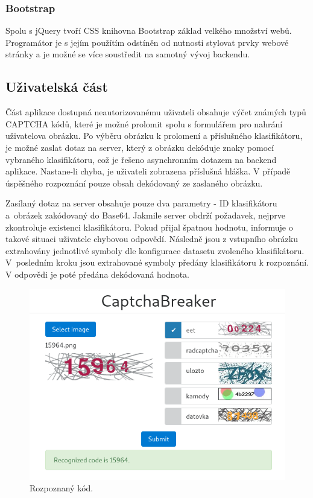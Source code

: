 \documentclass[
  field=ainfp,
  master=true,
  biblatex,
  sourcecodes=false,
  theorems=false,
  glossaries,
  index
]{kidiplom}
\begin{document}
\subsubsection*{Bootstrap}
Spolu s jQuery tvoří CSS knihovna Bootstrap základ velkého množství webů. Programátor je s jejím použítím odstíněn od nutnosti stylovat prvky webové stránky a je možné se více soustředit na samotný vývoj backendu.

\subsection{Uživatelská část}
Část aplikace dostupná neautorizovanému uživateli obsahuje výčet známých typů CAPTCHA kódů, které je možné prolomit spolu s formulářem pro nahrání uživatelova obrázku. Po výběru obrázku k prolomení a příslušného klasifikátoru, je možné zaslat dotaz na server, který z obrázku dekóduje znaky pomocí vybraného klasifikátoru, což je řešeno asynchronním dotazem na backend aplikace. Nastane-li chyba, je uživateli zobrazena příslušná hláška. V případě úspěšného rozpoznání pouze obsah dekódovaný ze zaslaného obrázku.

Zasílaný dotaz na server obsahuje pouze dva parametry - ID klasifikátoru a~obrázek zakódovaný do Base64. Jakmile server obdrží požadavek, nejprve zkontroluje existenci klasifikátoru. Pokud přijal špatnou hodnotu, informuje o takové situaci uživatele chybovou odpovědí. Následně jsou z vstupního obrázku extrahovány jednotlivé symboly dle konfigurace datasetu zvoleného klasifikátoru. V~posledním kroku jsou extrahované symboly předány klasifikátoru k rozpoznání. V odpovědi je poté předána dekódovaná hodnota.

\begin{figure}[H]
  \centering
  \includegraphics[scale=0.6]{images/website_public.png}
  \caption{Rozpoznaný kód.}
  \label{fig:resolved}
\end{figure}
\end{document}
